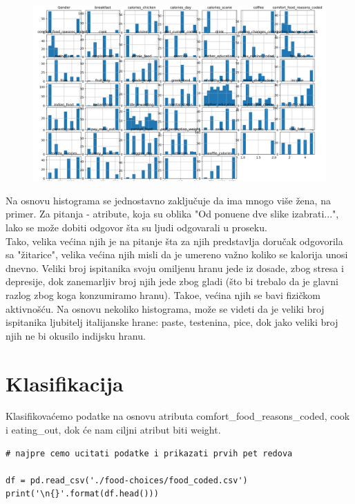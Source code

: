 \documentclass[12pt,a4paper]{article}
\begin{document}
\begin{figure}[H]
  \centering
  \includegraphics[width=15cm]{hist.png}
\end{figure}

Na osnovu histograma se jednostavno zaklju\v cuje da ima mnogo vi\v se \v zena, na primer. Za pitanja - atribute, koja su oblika "Od ponu\dj ene dve slike izabrati...", lako se mo\v ze dobiti odgovor \v sta su ljudi odgovarali u proseku. \\
Tako, velika ve\' cina njih je na pitanje \v sta za njih predstavlja doru\v cak odgovorila sa "\v zitarice", velika ve\' cina njih misli da je umereno va\v zno koliko se kalorija unosi dnevno. Veliki broj ispitanika svoju omiljenu hranu jede iz dosade, zbog stresa i depresije, dok zanemarljiv broj njih jede zbog gladi (\v sto bi trebalo da je glavni razlog zbog koga konzumiramo hranu). Tako\dj e, ve\' cina njih se bavi fizi\v ckom aktivno\v s\' cu. Na osnovu nekoliko histograma, mo\v ze se videti da je veliki broj ispitanika ljubitelj italijanske hrane: paste, testenina, pice, dok jako veliki broj njih ne bi okusilo indijsku hranu.

\newpage

\section{Klasifikacija}

Klasifikova\' cemo podatke na osnovu atributa comfort\_food\_reasons\_coded, cook i eating\_out, dok \' ce nam ciljni atribut biti weight.\\

\begin{lstlisting}[mathescape=true]
# najpre cemo ucitati podatke i prikazati prvih pet redova

df = pd.read_csv('./food-choices/food_coded.csv')
print('\n{}'.format(df.head()))
\end{lstlisting}
\end{document}
